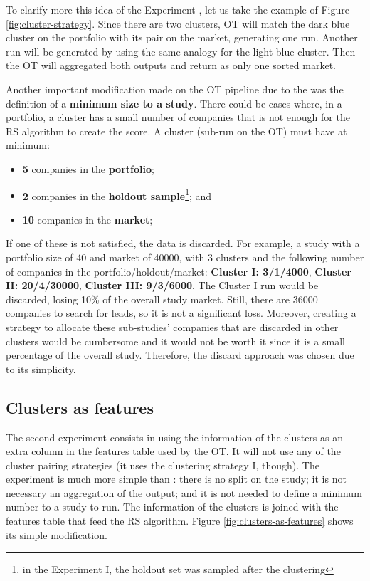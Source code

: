 To clarify more this idea of the Experiment \nameExperimentI{}, let us take the example of Figure \ref{fig:cluster-strategy}. Since there are two clusters, OT will match the dark blue cluster on the portfolio with its pair on the market, generating one run. Another run will be generated by using the same analogy for the light blue cluster. Then the OT will aggregated both outputs and return as only one sorted market.

Another important modification made on the OT pipeline due to the \nameExperimentI{} was the definition of a \textbf{minimum size to a study}. There could be cases where, in a portfolio, a cluster has a small number of companies that is not enough for the RS algorithm to create the score. A cluster (sub-run on the OT) must have at minimum:
\begin{itemize}
    \item \textbf{5} companies in the \textbf{portfolio};
    \item \textbf{2} companies in the \textbf{holdout sample}\footnote{in the Experiment I, the holdout set was sampled after the clustering}; and
    \item \textbf{10} companies in the \textbf{market};
\end{itemize}
If one of these is not satisfied, the data is discarded. For example, a study with a portfolio size of 40 and market of 40000, with 3 clusters and the following number of companies in the portfolio/holdout/market: \textbf{Cluster I: 3/1/4000}, \textbf{Cluster II: 20/4/30000}, \textbf{Cluster III: 9/3/6000}. The Cluster I run would be discarded, losing 10\% of the overall study market. Still, there are 36000 companies to search for leads, so it is not a significant loss. Moreover, creating a strategy to allocate these sub-studies' companies that are discarded in other clusters would be cumbersome and it would not be worth it since it is a small percentage of the overall study. Therefore, the discard approach was chosen due to its simplicity.

\subsection{Clusters as features}

The second experiment consists in using the information of the clusters as an extra column in the features table used by the OT. It will not use any of the cluster pairing strategies (it uses the clustering strategy I, though). The experiment \nameExperimentII{} is much more simple than \nameExperimentI{}: there is no split on the study; it is not necessary an aggregation of the output; and it is not needed to define a minimum number to a study to run. The information of the clusters is joined with the features table that feed the RS algorithm. Figure \ref{fig:clusters-as-features} shows its simple modification.

